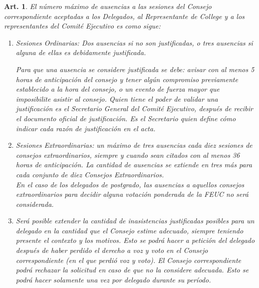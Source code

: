 \documentclass[letterpaper,11pt]{article}
\theoremstyle{plain}
\newtheorem{art}{Art.} %
\begin{document}
		\begin{art}\label{maxAusencias}
			El número máximo de ausencias a las sesiones del Consejo correspondiente aceptadas a los Delegados, al Representante de College y a los representantes del Comité Ejecutivo es como sigue:
			\begin{enumerate}
				\item \label{ausencias_A} Sesiones Ordinarias: Dos ausencias si no son justificadas, o tres ausencias si alguna de ellas es debidamente justificada.

				Para que una ausencia se considere justificada se debe: avisar con al menos 5 horas de anticipación del consejo y tener algún compromiso previamente establecido a la hora del consejo, o un evento de fuerza mayor que imposibilite asistir al consejo. 
				Quien tiene el poder de validar una justificación es el Secretario General del Comité Ejecutivo, después de recibir el documento oficial de justificación. Es el Secretario quien define cómo indicar cada razón de justificación en el acta.

				\item \label{ausencias_B} Sesiones Extraordinarias: un máximo de tres ausencias cada diez sesiones de consejos extraordinarios, siempre y cuando sean citados con al menos 36 horas de anticipación. La cantidad de ausencias se extiende en tres más para cada conjunto de diez Consejos Extraordinarios. \\
				En el caso de los delegados de postgrado, las ausencias a aquellos consejos extraordinarios para decidir alguna votación ponderada de la FEUC no será considerada.

				\item \label{extension_ausencias}
				Será posible extender la cantidad de inasistencias justificadas posibles para un delegado en la cantidad que el Consejo estime adecuado, siempre teniendo presente el contexto y los motivos. Esto se podrá hacer a petición del delegado después de haber perdido el derecho a voz y voto en el Consejo correspondiente (en el que perdió voz y voto). El Consejo correspondiente podrá rechazar la solicitud en caso de que no la considere adecuada. Esto se podrá hacer solamente una vez por delegado durante su período.

			\end{enumerate}


\end{art}
\end{document}
